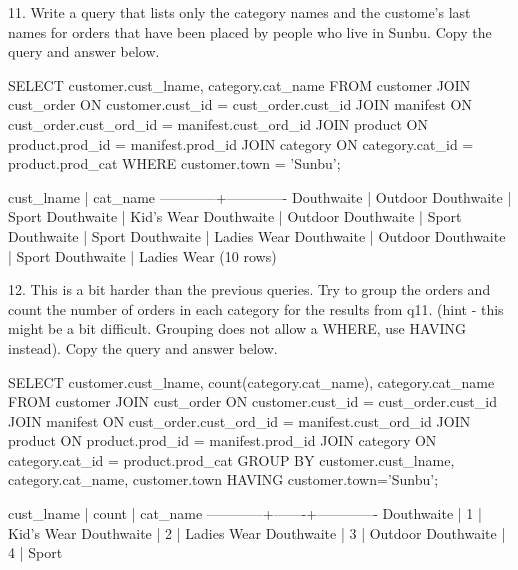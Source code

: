 11. Write a query that lists only the category names and the custome's last names for orders that have been placed by people who live in Sunbu. Copy the query and answer below.

\begin{sql}
SELECT customer.cust_lname, category.cat_name FROM customer
JOIN cust_order ON customer.cust_id = cust_order.cust_id
JOIN manifest ON cust_order.cust_ord_id = manifest.cust_ord_id
JOIN product ON product.prod_id = manifest.prod_id
JOIN category ON category.cat_id = product.prod_cat
WHERE customer.town = 'Sunbu';
\end{sql}
\begin{pseudo*}
 cust_lname |  cat_name   
------------+-------------
 Douthwaite | Outdoor
 Douthwaite | Sport
 Douthwaite | Kid's Wear
 Douthwaite | Outdoor
 Douthwaite | Sport
 Douthwaite | Sport
 Douthwaite | Ladies Wear
 Douthwaite | Outdoor
 Douthwaite | Sport
 Douthwaite | Ladies Wear
(10 rows)
\end{pseudo*}

12. This is a bit harder than the previous queries. Try to group the orders and count the number of orders in each category for the results from q11. (hint - this might be a bit difficult. Grouping does not allow a WHERE, use HAVING instead). Copy the query and answer below.
\begin{sql}
SELECT customer.cust_lname, count(category.cat_name), category.cat_name FROM customer
JOIN cust_order ON customer.cust_id = cust_order.cust_id
JOIN manifest ON cust_order.cust_ord_id = manifest.cust_ord_id
JOIN product ON product.prod_id = manifest.prod_id
JOIN category ON category.cat_id = product.prod_cat
GROUP BY customer.cust_lname, category.cat_name, customer.town
HAVING customer.town='Sunbu';
\end{sql}
\begin{pseudo*}
 cust_lname | count |  cat_name
------------+-------+-------------
 Douthwaite |     1 | Kid's Wear
 Douthwaite |     2 | Ladies Wear
 Douthwaite |     3 | Outdoor
 Douthwaite |     4 | Sport
\end{pseudo*}
